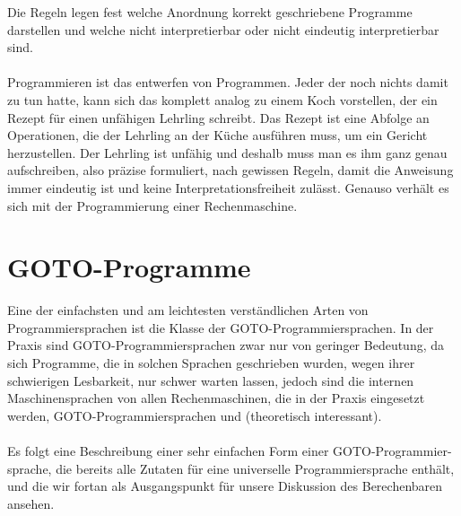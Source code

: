 \documentclass[11pt,a4paper,leqno]{report}
\numberwithin{equation}{chapter}
\begin{document}
Die Regeln legen fest welche Anordnung korrekt geschriebene Programme darstellen und welche nicht interpretierbar oder nicht eindeutig interpretierbar sind.\\
\\
Programmieren ist das entwerfen von Programmen. Jeder der noch nichts damit zu tun hatte, kann sich das komplett analog zu einem Koch vorstellen, der ein Rezept f\"ur einen unf\"ahigen Lehrling schreibt. Das Rezept ist eine Abfolge an Operationen, die der Lehrling an der K\"uche ausf\"uhren muss, um ein Gericht herzustellen. Der Lehrling ist unf\"ahig und deshalb muss man es ihm ganz genau aufschreiben, also pr\"azise formuliert, nach gewissen Regeln, damit die Anweisung immer eindeutig ist und keine Interpretationsfreiheit zul\"asst. Genauso verh\"alt es sich mit der Programmierung einer Rechenmaschine.

\section{GOTO-Programme}
Eine der einfachsten und am leichtesten verst\"andlichen Arten von Programmiersprachen ist die Klasse der GOTO-Programmiersprachen. In der Praxis sind GOTO-Programmiersprachen zwar nur von geringer Bedeutung, da sich Programme, die in solchen Sprachen geschrieben wurden, wegen ihrer schwierigen Lesbarkeit, nur schwer warten lassen, jedoch sind die internen Maschinensprachen von allen Rechenmaschinen, die in der Praxis eingesetzt werden, GOTO-Programmiersprachen und (theoretisch interessant).\\
\\
Es folgt eine Beschreibung einer sehr einfachen Form einer GOTO-Programmier- sprache, die bereits alle Zutaten f\"ur eine universelle Programmiersprache enth\"alt, und die wir fortan als Ausgangspunkt f\"ur unsere Diskussion des Berechenbaren ansehen.
\end{document}
